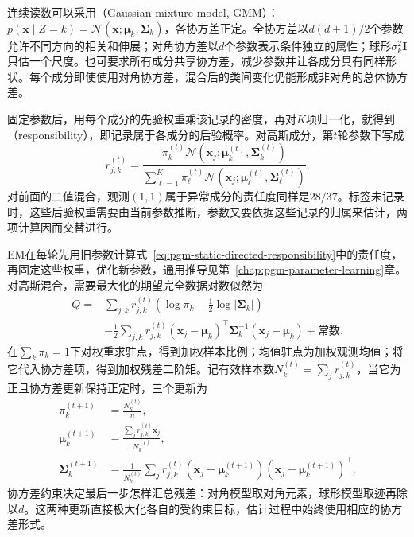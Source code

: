 连续读数可以采用（Gaussian mixture model, GMM）：$p(\bm x\mid Z=k)=\mathcal N(\bm x;\bm\mu_k,\bm\Sigma_k)$，各协方差正定。全协方差以$d(d+1)/2$个参数允许不同方向的相关和伸展；对角协方差以$d$个参数表示条件独立的属性；球形$\sigma_k^2\bm I$只估一个尺度。也可要求所有成分共享协方差，减少参数并让各成分具有同样形状。每个成分即使使用对角协方差，混合后的类间变化仍能形成非对角的总体协方差。

固定参数后，用每个成分的先验权重乘该记录的密度，再对$K$项归一化，就得到（responsibility），即记录属于各成分的后验概率。对高斯成分，第$t$轮参数下写成
\begin{equation}
  \label{eq:pgm-static-directed-responsibility}
  r_{j,k}^{(t)}=
  \frac{\pi_k^{(t)}
      \mathcal{N}(\bm{x}_j;\bm{\mu}_k^{(t)},\bm{\Sigma}_k^{(t)})}
       {\sum_{\ell=1}^{K}\pi_\ell^{(t)}
      \mathcal{N}(\bm{x}_j;\bm{\mu}_\ell^{(t)},\bm{\Sigma}_\ell^{(t)})}.
\end{equation}
对前面的二值混合，观测$(1,1)$属于异常成分的责任度同样是$28/37$。标签未记录时，这些后验权重需要由当前参数推断，参数又要依据这些记录的归属来估计，两项计算因而交替进行。

EM在每轮先用旧参数计算式~\eqref{eq:pgm-static-directed-responsibility}中的责任度，再固定这些权重，优化新参数，通用推导见第~\ref{chap:pgm-parameter-learning}章。对高斯混合，需要最大化的期望完全数据对数似然为
\[
  \begin{aligned}
    Q={}&\sum_{j,k}r_{j,k}^{(t)}
       \left(\log\pi_k-\frac12\log|\bm{\Sigma}_k|\right)\\
       &-\frac12\sum_{j,k}r_{j,k}^{(t)}
         (\bm{x}_j-\bm{\mu}_k)^\top
          \bm{\Sigma}_k^{-1}(\bm{x}_j-\bm{\mu}_k)
       +\text{常数}.
  \end{aligned}
\]
在$\sum_k\pi_k=1$下对权重求驻点，得到加权样本比例；均值驻点为加权观测均值；将它代入协方差项，得到加权残差二阶矩。记有效样本数$N_k^{(t)}=\sum_jr_{j,k}^{(t)}$，当它为正且协方差更新保持正定时，三个更新为
\begin{equation}
  \label{eq:pgm-static-directed-gmm-em}
  \begin{aligned}
    \pi_k^{(t+1)}&=\frac{N_k^{(t)}}{n},\\
    \bm{\mu}_k^{(t+1)}
      &=\frac{\sum_jr_{j,k}^{(t)}\bm{x}_j}{N_k^{(t)}},\\
    \bm{\Sigma}_k^{(t+1)}
      &=\frac{1}{N_k^{(t)}}\sum_jr_{j,k}^{(t)}
       (\bm{x}_j-\bm{\mu}_k^{(t+1)})
       (\bm{x}_j-\bm{\mu}_k^{(t+1)})^\top.
  \end{aligned}
\end{equation}
协方差约束决定最后一步怎样汇总残差：对角模型取对角元素，球形模型取迹再除以$d$。这两种更新直接极大化各自的受约束目标，估计过程中始终使用相应的协方差形式。

